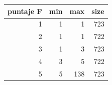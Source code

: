 \begin{tabular}{rrrr}
\toprule
puntaje F & min & max & size \\
\midrule
1 & 1 & 1 & 723 \\
2 & 1 & 1 & 722 \\
3 & 1 & 3 & 723 \\
4 & 3 & 5 & 722 \\
5 & 5 & 138 & 723 \\
\bottomrule
\end{tabular}

